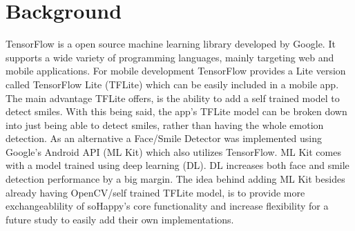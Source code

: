\section{Background} \label{sec:background}
TensorFlow \cite{tensorflow} is a open source machine learning library developed by Google.
It supports a wide variety of programming languages, mainly targeting web and mobile applications.
For mobile development TensorFlow provides a Lite version called TensorFlow Lite (TFLite) which can be easily included in a mobile app.
The main advantage TFLite offers, is the ability to add a self trained model to detect smiles.
With this being said, the app's TFLite model can be broken down into just being able to detect smiles, rather than having the whole emotion detection.
As an alternative a Face/Smile Detector was implemented using Google's Android API (ML Kit) \cite{mlkit} which also utilizes TensorFlow.
ML Kit comes with a model trained using deep learning (DL).
DL increases both face and smile detection performance by a big margin.
The idea behind adding ML Kit besides already having OpenCV/self trained TFLite model, is to provide more exchangeablility of soHappy's core functionality and increase flexibility for a future study to easily add their own implementations.
